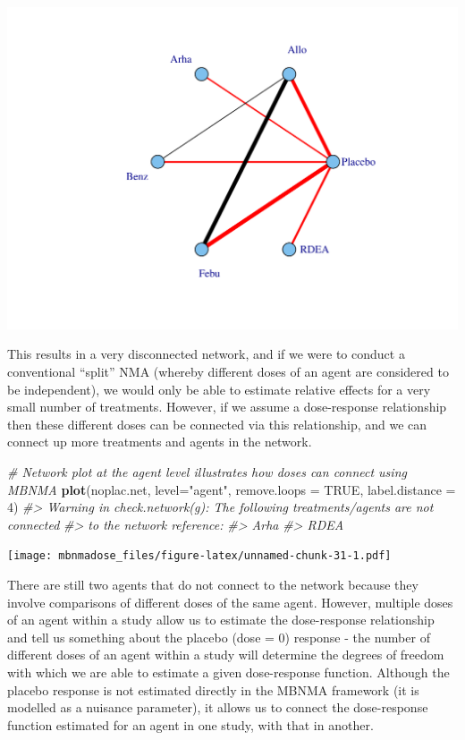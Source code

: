 \documentclass[]{article}
\newenvironment{Shaded}{\begin{snugshade}}{\end{snugshade}}
\newcommand{\CommentTok}[1]{\textcolor[rgb]{0.56,0.35,0.01}{\textit{#1}}}
\newcommand{\DataTypeTok}[1]{\textcolor[rgb]{0.13,0.29,0.53}{#1}}
\newcommand{\DecValTok}[1]{\textcolor[rgb]{0.00,0.00,0.81}{#1}}
\newcommand{\KeywordTok}[1]{\textcolor[rgb]{0.13,0.29,0.53}{\textbf{#1}}}
\newcommand{\NormalTok}[1]{#1}
\newcommand{\OtherTok}[1]{\textcolor[rgb]{0.56,0.35,0.01}{#1}}
\newcommand{\StringTok}[1]{\textcolor[rgb]{0.31,0.60,0.02}{#1}}
\begin{document}
\includegraphics{mbnmadose_files/figure-latex/unnamed-chunk-30-1.pdf}

This results in a very disconnected network, and if we were to conduct a
conventional ``split'' NMA (whereby different doses of an agent are
considered to be independent), we would only be able to estimate
relative effects for a very small number of treatments. However, if we
assume a dose-response relationship then these different doses can be
connected via this relationship, and we can connect up more treatments
and agents in the network.

\begin{Shaded}
\begin{Highlighting}[]
\CommentTok{# Network plot at the agent level illustrates how doses can connect using MBNMA}
\KeywordTok{plot}\NormalTok{(noplac.net, }\DataTypeTok{level=}\StringTok{"agent"}\NormalTok{, }\DataTypeTok{remove.loops =} \OtherTok{TRUE}\NormalTok{, }\DataTypeTok{label.distance =} \DecValTok{4}\NormalTok{)}
\CommentTok{#> Warning in check.network(g): The following treatments/agents are not connected}
\CommentTok{#> to the network reference:}
\CommentTok{#> Arha}
\CommentTok{#> RDEA}
\end{Highlighting}
\end{Shaded}

\texttt{[image: mbnmadose\_files/figure-latex/unnamed-chunk-31-1.pdf]}

There are still two agents that do not connect to the network because
they involve comparisons of different doses of the same agent. However,
multiple doses of an agent within a study allow us to estimate the
dose-response relationship and tell us something about the placebo (dose
= 0) response - the number of different doses of an agent within a study
will determine the degrees of freedom with which we are able to estimate
a given dose-response function. Although the placebo response is not
estimated directly in the MBNMA framework (it is modelled as a nuisance
parameter), it allows us to connect the dose-response function estimated
for an agent in one study, with that in another.
\end{document}
